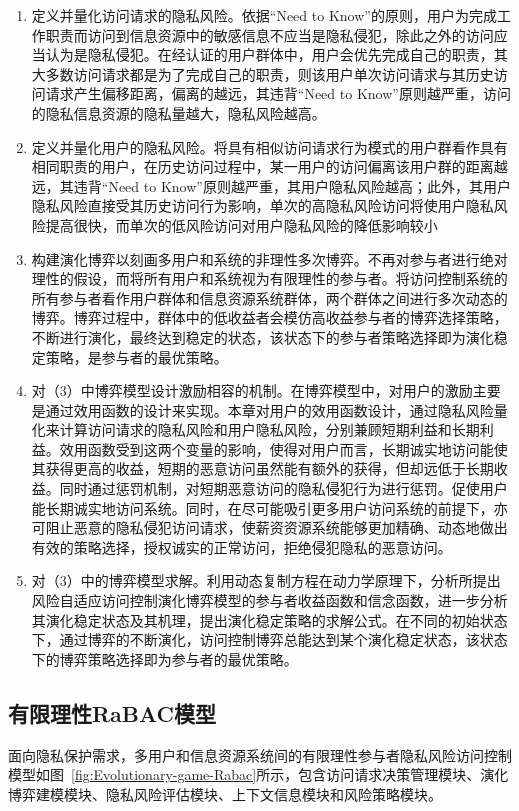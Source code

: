 \begin{enumerate}
	\item 定义并量化访问请求的隐私风险。依据“Need to Know”的原则，用户为完成工作职责而访问到信息资源中的敏感信息不应当是隐私侵犯，除此之外的访问应当认为是隐私侵犯。在经认证的用户群体中，用户会优先完成自己的职责，其大多数访问请求都是为了完成自己的职责，则该用户单次访问请求与其历史访问请求产生偏移距离，偏离的越远，其违背“Need to Know”原则越严重，访问的隐私信息资源的隐私量越大，隐私风险越高。
	\item 定义并量化用户的隐私风险。将具有相似访问请求行为模式的用户群看作具有相同职责的用户，在历史访问过程中，某一用户的访问偏离该用户群的距离越远，其违背“Need to Know”原则越严重，其用户隐私风险越高；此外，其用户隐私风险直接受其历史访问行为影响，单次的高隐私风险访问将使用户隐私风险提高很快，而单次的低风险访问对用户隐私风险的降低影响较小
	\item 构建演化博弈以刻画多用户和系统的非理性多次博弈。不再对参与者进行绝对理性的假设，而将所有用户和系统视为有限理性的参与者。将访问控制系统的所有参与者看作用户群体和信息资源系统群体，两个群体之间进行多次动态的博弈。博弈过程中，群体中的低收益者会模仿高收益参与者的博弈选择策略，不断进行演化，最终达到稳定的状态，该状态下的参与者策略选择即为演化稳定策略，是参与者的最优策略。
	\item 对（3）中博弈模型设计激励相容的机制。在博弈模型中，对用户的激励主要是通过效用函数的设计来实现。本章对用户的效用函数设计，通过隐私风险量化来计算访问请求的隐私风险和用户隐私风险，分别兼顾短期利益和长期利益。效用函数受到这两个变量的影响，使得对用户而言，长期诚实地访问能使其获得更高的收益，短期的恶意访问虽然能有额外的获得，但却远低于长期收益。同时通过惩罚机制，对短期恶意访问的隐私侵犯行为进行惩罚。促使用户能长期诚实地访问系统。同时，在尽可能吸引更多用户访问系统的前提下，亦可阻止恶意的隐私侵犯访问请求，使薪资资源系统能够更加精确、动态地做出有效的策略选择，授权诚实的正常访问，拒绝侵犯隐私的恶意访问。
	\item 对（3）中的博弈模型求解。利用动态复制方程在动力学原理下，分析所提出风险自适应访问控制演化博弈模型的参与者收益函数和信念函数，进一步分析其演化稳定状态及其机理，提出演化稳定策略的求解公式。在不同的初始状态下，通过博弈的不断演化，访问控制博弈总能达到某个演化稳定状态，该状态下的博弈策略选择即为参与者的最优策略。
\end{enumerate}

\subsection{有限理性RaBAC模型}
面向隐私保护需求，多用户和信息资源系统间的有限理性参与者隐私风险访问控制模型如图~\ref{fig:Evolutionary-game-Rabac}所示，包含访问请求决策管理模块、演化博弈建模模块、隐私风险评估模块、上下文信息模块和风险策略模块。


